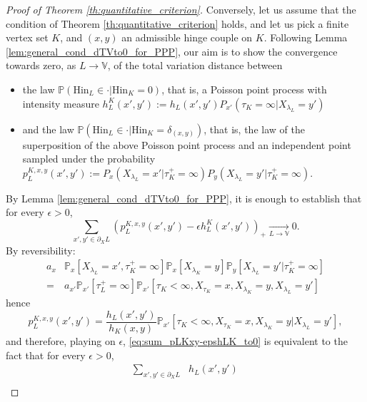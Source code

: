 \documentclass[12pt,a4paper]{article}
\newcommand{\1}[1]{{\mathbf 1}{\{#1\}}}
\newcommand{\8}{{\infty}}
\newcommand{\p}{\mathbb{P}}
\newcommand{\Hin}{\mathrm{Hin}}
\begin{document}
\begin{proof}[Proof of Theorem \ref{th:quantitative_criterion}]
\medskip 

Conversely, let us assume that the condition of Theorem \ref{th:quantitative_criterion} holds, and let us pick a finite vertex set $K$, and $(x,y)$ an admissible hinge couple on $K$. Following Lemma \ref{lem:general_cond_dTVto0_for_PPP}, our aim is to show the convergence towards zero, as $L\to\mathbb{V}$, of the total variation distance between
\begin{itemize}
  \item the law 
  $\mathbb{P}(\Hin_L \in \cdot | \Hin_K=0)$, that is, a Poisson point process with intensity measure 
  $h_{L}^{K}(x',y') := h_L(x',y') P_{x'}(\tau_K=\infty|X_{\lambda_L}=y')$
  \item and the law 
  $\mathbb{P}(\Hin_L \in \cdot | \Hin_K=\delta_{(x,y)})$, that is, the law of the superposition of the above Poisson point process and an independent point sampled under the probability 
  $p_{L}^{K, x,y} (x', y'):= P_x(X_{\lambda_L}= x'| \tau_K^+=\infty) P_y(X_{\lambda_L}= y'| \tau_K^+=\infty)$.
\end{itemize}
By Lemma \ref{lem:general_cond_dTVto0_for_PPP}, it is enough to establish that for every $\epsilon>0$, 
\begin{equation}\label{eq:sum_pLKxy-epshLK_to0}
  \sum_{x',y' \in \partial_X L} 
  \left(p_L^{K, x, y}(x',y') 
  - \epsilon h_L^{K}(x',y') \right)_+  \underset{L \to \mathbb{V}}{\longrightarrow} 0.
\end{equation}
By reversibility:
\begin{equation}
  \begin{aligned}
  a_x &  \p_x[X_{\lambda_L}=x', \tau_K^+=\infty]   \p_x[X_{\lambda_K}=y] \p_y[X_{\lambda_L}=y' | \tau_K^+=\infty] \\
   =  & a_{x'} \p_{x'}[\tau_L^+=\infty]
   \p_{x'}[\tau_K < \infty, X_{\tau_K} = x, X_{\lambda_K}=y, X_{\lambda_L}=y']
  \end{aligned}
\end{equation}
hence
\begin{equation}
  p_L^{K, x, y}(x',y')= \frac {h_L(x', y')}{ h_K(x, y)} 
  \p_{x'}[\tau_K < \infty, X_{\tau_K} = x, X_{\lambda_K}=y| X_{\lambda_L}=y'],
\end{equation}%
and therefore, playing on $\epsilon$, \eqref{eq:sum_pLKxy-epshLK_to0} is equivalent to the fact that for every $\epsilon>0$, 
\begin{equation}
  \begin{aligned}
    \sum_{x', y'\in \partial_X L} &  h_L(x', y') \\

\end{aligned}
\end{equation}
\end{proof}
\end{document}
